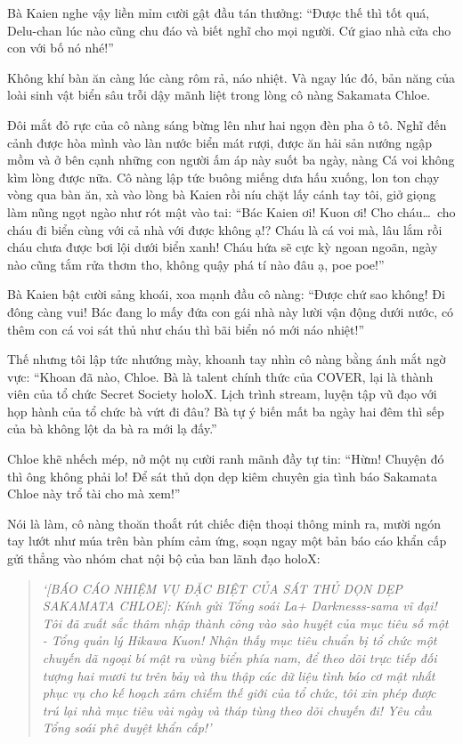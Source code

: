 \documentclass[../main.tex]{subfiles}
\begin{document}
Bà Kaien nghe vậy liền mỉm cười gật đầu tán thưởng: ``Được thế thì tốt quá, Delu-chan lúc nào cũng chu đáo và biết nghĩ cho mọi người. Cứ giao nhà cửa cho con với bố nó nhé!''

Không khí bàn ăn càng lúc càng rôm rả, náo nhiệt. Và ngay lúc đó, bản năng của loài sinh vật biển sâu trỗi dậy mãnh liệt trong lòng cô nàng Sakamata Chloe.

Đôi mắt đỏ rực của cô nàng sáng bừng lên như hai ngọn đèn pha ô tô. Nghĩ đến cảnh được hòa mình vào làn nước biển mát rượi, được ăn hải sản nướng ngập mồm và ở bên cạnh những con người ấm áp này suốt ba ngày, nàng Cá voi không kìm lòng được nữa. Cô nàng lập tức buông miếng dưa hấu xuống, lon ton chạy vòng qua bàn ăn, xà vào lòng bà Kaien rồi níu chặt lấy cánh tay tôi, giở giọng làm nũng ngọt ngào như rót mật vào tai: ``Bác Kaien ơi! Kuon ơi! Cho cháu\dots\ cho cháu đi biển cùng với cả nhà với được không ạ!? Cháu là cá voi mà, lâu lắm rồi cháu chưa được bơi lội dưới biển xanh! Cháu hứa sẽ cực kỳ ngoan ngoãn, ngày nào cũng tắm rửa thơm tho, không quậy phá tí nào đâu ạ, poe poe!''

Bà Kaien bật cười sảng khoái, xoa mạnh đầu cô nàng: ``Được chứ sao không! Đi đông càng vui! Bác đang lo mấy đứa con gái nhà này lười vận động dưới nước, có thêm con cá voi sát thủ như cháu thì bãi biển nó mới náo nhiệt!''

Thế nhưng tôi lập tức nhướng mày, khoanh tay nhìn cô nàng bằng ánh mắt ngờ vực: ``Khoan đã nào, Chloe. Bà là talent chính thức của COVER, lại là thành viên của tổ chức Secret Society holoX. Lịch trình stream, luyện tập vũ đạo với họp hành của tổ chức bà vứt đi đâu? Bà tự ý biến mất ba ngày hai đêm thì sếp của bà không lột da bà ra mới lạ đấy.''

Chloe khẽ nhếch mép, nở một nụ cười ranh mãnh đầy tự tin: ``Hừm! Chuyện đó thì ông không phải lo! Để sát thủ dọn dẹp kiêm chuyên gia tình báo Sakamata Chloe này trổ tài cho mà xem!''

Nói là làm, cô nàng thoăn thoắt rút chiếc điện thoại thông minh ra, mười ngón tay lướt như múa trên bàn phím cảm ứng, soạn ngay một bản báo cáo khẩn cấp gửi thẳng vào nhóm chat nội bộ của ban lãnh đạo holoX:

\begin{quote}
    \textit{`[BÁO CÁO NHIỆM VỤ ĐẶC BIỆT CỦA SÁT THỦ DỌN DẸP SAKAMATA CHLOE]: Kính gửi Tổng soái La+ Darknesss-sama vĩ đại! Tôi đã xuất sắc thâm nhập thành công vào sào huyệt của mục tiêu số một - Tổng quản lý Hikawa Kuon! Nhận thấy mục tiêu chuẩn bị tổ chức một chuyến dã ngoại bí mật ra vùng biển phía nam, để theo dõi trực tiếp đối tượng hai mươi tư trên bảy và thu thập các dữ liệu tình báo cơ mật nhất phục vụ cho kế hoạch xâm chiếm thế giới của tổ chức, tôi xin phép được trú lại nhà mục tiêu vài ngày và tháp tùng theo dõi chuyến đi! Yêu cầu Tổng soái phê duyệt khẩn cấp!'}
\end{quote}
\end{document}
